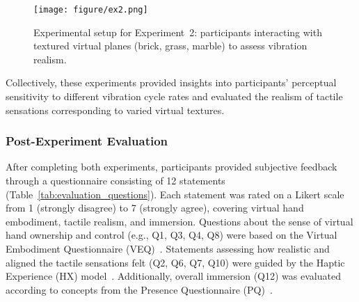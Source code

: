 \documentclass[graybox]{svmult}
\begin{document}
\begin{figure}[H]
	\centering
	\texttt{[image: figure/ex2.png]}%
	\caption{Experimental setup for Experiment~2: participants interacting with textured virtual planes (brick, grass, marble) to assess vibration realism.}\label{fig:experiment2_setup}
\end{figure}

Collectively, these experiments provided insights into participants' perceptual sensitivity to different vibration cycle rates and evaluated the realism of tactile sensations corresponding to varied virtual textures.

\subsubsection{Post-Experiment Evaluation}
After completing both experiments, participants provided subjective feedback through a questionnaire consisting of 12 statements (Table~\ref{tab:evaluation_questions}). Each statement was rated on a Likert scale from 1 (strongly disagree) to 7 (strongly agree), covering virtual hand embodiment, tactile realism, and immersion. Questions about the sense of virtual hand ownership and control (e.g., Q1, Q3, Q4, Q8) were based on the Virtual Embodiment Questionnaire (VEQ)~\cite{roth2017alpha}. Statements assessing how realistic and aligned the tactile sensations felt (Q2, Q6, Q7, Q10) were guided by the Haptic Experience (HX) model~\cite{schneider2017haptic}. Additionally, overall immersion (Q12) was evaluated according to concepts from the Presence Questionnaire (PQ)~\cite{witmer1998measuring}.
\end{document}
